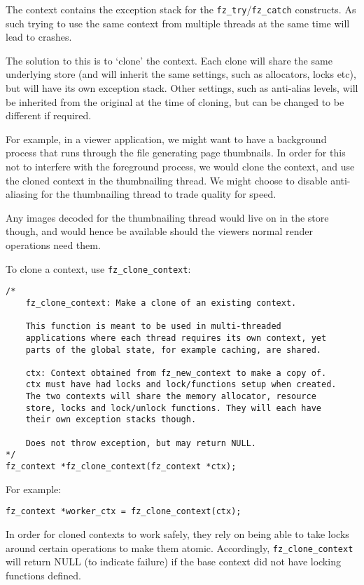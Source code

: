 \documentclass[oneside]{book}
\begin{document}
The context contains the exception stack for the \texttt{fz\_try}\slash\texttt{fz\_catch} constructs. As such trying to use the same context from multiple threads at the same time will lead to crashes.

The solution to this is to `clone' the context. Each clone will share the same underlying store (and will inherit the same settings, such as allocators, locks etc), but will have its own exception stack. Other settings, such as anti-alias levels, will be inherited from the original at the time of cloning, but can be changed to be different if required.

For example, in a viewer application, we might want to have a background process that runs through the file generating page thumbnails. In order for this not to interfere with the foreground process, we would clone the context, and use the cloned context in the thumbnailing thread. We might choose to disable anti-aliasing for the thumbnailing thread to trade quality for speed.

Any images decoded for the thumbnailing thread would live on in the store though, and would hence be available should the viewers normal render operations need them.

To clone a context, use \texttt{fz\_clone\_context}:

\begin{lstlisting}
/*
	fz_clone_context: Make a clone of an existing context.

	This function is meant to be used in multi-threaded
	applications where each thread requires its own context, yet
	parts of the global state, for example caching, are shared.

	ctx: Context obtained from fz_new_context to make a copy of.
	ctx must have had locks and lock/functions setup when created.
	The two contexts will share the memory allocator, resource
	store, locks and lock/unlock functions. They will each have
	their own exception stacks though.

	Does not throw exception, but may return NULL.
*/
fz_context *fz_clone_context(fz_context *ctx);
\end{lstlisting}

For example:

\begin{lstlisting}
fz_context *worker_ctx = fz_clone_context(ctx);
\end{lstlisting}

In order for cloned contexts to work safely, they rely on being able to take locks around certain operations to make them atomic. Accordingly, \texttt{fz\_clone\_context} will return NULL (to indicate failure) if the base context did not have locking functions defined.
\end{document}

